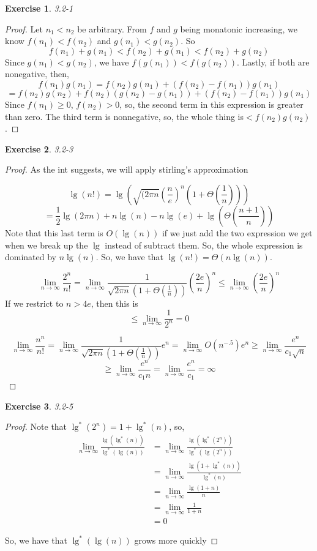 \documentclass{article}
\newtheorem{th1}{Exercise}
\begin{document}
\begin{th1}\label{ex5}
3.2-1
\end{th1}
\begin{proof}
Let $n_1 < n_2$ be arbitrary. From $f$ and $g$ being monatonic increasing, we know $f(n_1)< f(n_2)$ and $g(n_1) < g(n_2)$. So
\[
f(n_1)+g(n_1) < f(n_2) + g(n_1) < f(n_2)+g(n_2)
\]
Since $g(n_1)<g(n_2)$, we have $f(g(n_1))<f(g(n_2))$. Lastly, if both are nonegative, then, 
\[
f(n_1)g(n_1) = f(n_2)g(n_1) + (f(n_2)-f(n_1))g(n_1) \]\[= f(n_2)g(n_2) + f(n_2)(g(n_2)-g(n_1)) +(f(n_2)-f(n_1))g(n_1) 
\]
Since $f(n_1)\ge 0$, $f(n_2)>0$, so, the second term in this expression is greater than zero. The third term is nonnegative, so, the whole thing is$<f(n_2)g(n_2)$.
\end{proof}
\begin{th1}\label{ex6}
3.2-3
\end{th1}
\begin{proof}
As the int suggests, we will apply stirling's approximation

\[
\lg(n!) = \lg\left(\sqrt{(2\pi n}\left(\frac{n}{e}\right)^n\left( 1 + \Theta\left(\frac{1}{n}\right)\right)\right) \]\[= \frac{1}{2}\lg(2\pi n) + n\lg(n) - n \lg (e) + \lg\left(\Theta\left(\frac{n+1}{n}\right)\right)
\]
Note that this last term is $O(\lg(n))$ if we just add the two expression we get when we break up the $\lg$ instead of subtract them. So, the whole expression is dominated by $n\lg(n)$. So, we have that $\lg(n!) = \Theta(n\lg(n))$.

\[
\lim_{n\rightarrow\infty} \frac{2^n}{n!} = \lim_{n\rightarrow\infty} \frac{1}{\sqrt{2\pi n}(1+\Theta(\frac{1}{n}))} \left(\frac{2e}{n}\right)^n \le  \lim_{n\rightarrow\infty} \left(\frac{2e}{n}\right)^n
\]
If we restrict to $n> 4e$, then this is 
\[
\le \lim_{n\rightarrow\infty} \frac{1}{2^n} = 0
\]

\[
\lim_{n\rightarrow\infty} \frac{n^n}{n!} = \lim_{n\rightarrow\infty} \frac{1}{\sqrt{2\pi n}(1+\Theta(\frac{1}{n}))}e^n =  \lim_{n\rightarrow\infty} O(n^{-.5})e^n \ge \lim_{n\rightarrow\infty} \frac{e^n}{c_1\sqrt{n}}\]\[ \ge\lim_{n\rightarrow\infty} \frac{e^n}{c_1n} =  \lim_{n\rightarrow\infty} \frac{e^n}{c_1} = \infty
\]

\end{proof}
\begin{th1}\label{ex7}
3.2-5
\end{th1}
\begin{proof}
Note that $\lg^*(2^n) = 1+ \lg^*(n)$, so, 
\begin{align*}
\lim_{n\rightarrow \infty} \frac{\lg(\lg^*(n))}{\lg^*(\lg(n))}&= \lim_{n\rightarrow \infty} \frac{\lg(\lg^*(2^n))}{\lg^*(\lg(2^n))}\\
& = \lim_{n\rightarrow \infty} \frac{\lg(1+\lg^*(n))}{\lg^*(n)} \\
&= \lim_{n\rightarrow \infty} \frac{\lg(1+n)}{n} \\
&= \lim_{n\rightarrow \infty} \frac{1}{1+n} \\
&= 0
\end{align*}

So, we have that $\lg^*(\lg(n))$ grows more quickly
\end{proof}
\end{document}
